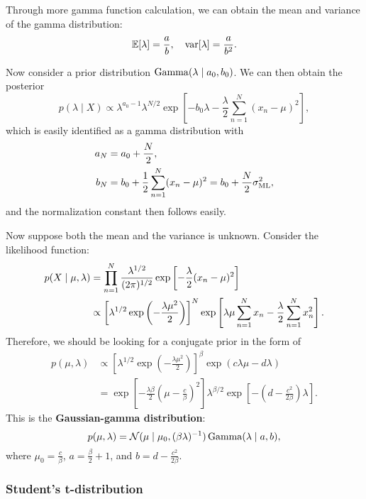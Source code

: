 \documentclass[a4paper]{article}
\begin{document}
Through more gamma function calculation, we can 
obtain the mean and variance of the gamma distribution:
\[
\mathbb{E}[\lambda] = \frac{a}{b}, 
\quad 
\operatorname{var}[\lambda] = \frac{a}{b^2}.
\]

Now consider a prior distribution $\operatorname{Gamma}(\lambda 
\mid a_0, b_0)$. We can then obtain the posterior
\[
p(\lambda \mid X) 
\propto \lambda^{a_0 - 1} \lambda^{N / 2} 
\exp \left[ - b_0 \lambda - \frac{\lambda}{2} 
\sum_{n=1}^N (x_n - \mu)^2 \right],
\]
which is easily identified as a gamma distribution with 
\[
\begin{aligned}
a_N &= a_0 + \frac{N}{2}, \\
b_N &= b_0 + \frac{1}{2} \sum_{n=1}^N (x_n - \mu)^2
= b_0 + \frac{N}{2} \sigma_{\text{ML}}^2,
\end{aligned}
\]
and the normalization constant then follows easily.

Now suppose both the mean and the variance is unknown.
Consider the likelihood function: 
\[
\begin{aligned}
p(X \mid \mu, \lambda)
&= \prod_{n=1}^N \frac{\lambda^{1 / 2}}{(2 \pi)^{1 / 2}}
\exp \left[ - \frac{\lambda}{2} (x_n - \mu)^2 \right] \\
&\propto \left[ \lambda^{1 / 2} \exp \left( - 
\frac{\lambda \mu^2}{2} \right) \right]^{N}
\exp \left[ \lambda \mu \sum_{n=1}^N x_n 
- \frac{\lambda}{2} \sum_{n=1}^N x_n^2 \right].
\end{aligned}
\]
Therefore, we should be looking for a conjugate prior 
in the form of 
\[
\begin{aligned}
p(\mu, \lambda)
&\propto \left[ \lambda^{1 / 2} \exp \left( - \frac{\lambda \mu^2}
{2} \right) \right]^\beta \exp \left( c \lambda \mu - 
d \lambda \right) \\
&= \exp \left[ - \frac{\lambda \beta}{2} 
\left( \mu - \frac{c}{\beta} \right)^2 \right]
\lambda^{\beta / 2} \exp \left[ - \left( d - 
\frac{c^2}{2 \beta} \right) \lambda \right].
\end{aligned}
\]
This is the \textbf{Gaussian-gamma distribution}: 
\[
p(\mu, \lambda) 
= \mathcal{N} (\mu \mid \mu_0, (\beta \lambda)^{-1}) 
\operatorname{Gamma} (\lambda \mid a, b),
\]
where $\mu_0 = \frac{c}{\beta}$, $a = \frac{\beta}{2} + 1$,
and $b = d - \frac{c^2}{2 \beta}$.

\subsubsection{Student's t-distribution}
\end{document}
